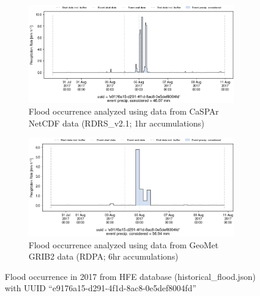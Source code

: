 \documentclass[10pt,a4paper,titlepage,parskip]{scrartcl}
\begin{document}
\begin{figure}[h]
	\begin{subfigure}[a]{1.0\textwidth}
		\centering
		\includegraphics[width=\linewidth]{figures/compare_Geomet_CaSPAr/interpolated_at_stations_occurrence_1058_identified-timesteps_RDRS_v2.1.png}
		\caption{Flood occurrence analyzed using data from CaSPAr NetCDF data (RDRS\_v2.1; 1hr accumulations)}
	\end{subfigure}
	\par\bigskip\bigskip
	\begin{subfigure}[b]{1.0\textwidth}
		\centering
		\includegraphics[width=\linewidth]{figures/compare_Geomet_CaSPAr/interpolated_at_stations_occurrence_1058_identified-timesteps_rdpa_10km_6f.png}
		\caption{Flood occurrence analyzed using data from GeoMet GRIB2 data (RDPA; 6hr accumulations)}
	\end{subfigure}
	\par\bigskip\bigskip
	\caption{Flood occurrence in 2017 from HFE database (historical\_flood.json) with UUID ``e9176a15-d291-4f1d-8ac8-0e5def8004fd''}
\end{figure}
\pagebreak
\end{document}
